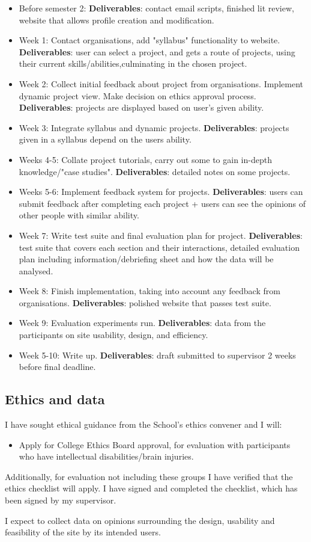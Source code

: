 \documentclass[11pt]{article}
\begin{document}
\begin{itemize}
    \item Before semester 2: \textbf{Deliverables}: contact email scripts, finished lit review, website that allows profile creation and modification.
    \item Week 1: Contact organisations, add "syllabus" functionality to website. \textbf{Deliverables}: user can select a project, and gets a route of projects, using their current skills/abilities,culminating in the chosen project. 
    \item Week 2: Collect initial feedback about project from organisations. Implement dynamic project view. Make decision on ethics approval process. \textbf{Deliverables}: projects are displayed based on user's given ability. 
    \item Week 3: Integrate syllabus and dynamic projects. \textbf{Deliverables}: projects given in a syllabus depend on the users ability.  
    \item Weeks 4-5: Collate project tutorials, carry out some to gain in-depth knowledge/"case studies". \textbf{Deliverables}: detailed notes on some projects. 
    \item Weeks 5-6: Implement feedback system for projects. \textbf{Deliverables}: users can submit feedback after completing each project + users can see the opinions of other people with similar ability.
    \item Week 7: Write test suite and final evaluation plan for project. \textbf{Deliverables}: test suite that covers each section and their interactions, detailed evaluation plan including information/debriefing sheet and how the data will be analysed. 
    \item Week 8: Finish implementation, taking into account any feedback from organisations. \textbf{Deliverables}: polished website that passes test suite.
    \item Week 9: Evaluation experiments run. \textbf{Deliverables}: data from the participants on site usability, design, and efficiency.
    \item Week 5-10: Write up. \textbf{Deliverables}: draft submitted to supervisor 2 weeks before final deadline. 
\end{itemize}

\subsection{Ethics and data}\label{ethics}

I have sought ethical guidance from the School's ethics convener and I will: 
    \begin{itemize}
        \item Apply for College Ethics Board approval, for evaluation with participants who have intellectual disabilities/brain injuries.    
    \end{itemize}

Additionally, for evaluation not including these groups I have verified that the ethics checklist will apply. I have signed and completed the checklist, which has been signed by my supervisor. 

I expect to collect data on opinions surrounding the design, usability and feasibility of the site by its intended users. 
\end{document}
